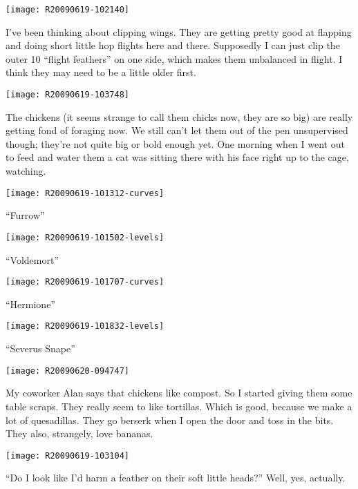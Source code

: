\texttt{[image: R20090619-102140]}

I've been thinking about clipping wings.  They are getting pretty good
at flapping and doing short little hop flights here and there.
Supposedly I can just clip the outer 10 ``flight feathers'' on one side,
which makes them unbalanced in flight.  I think they may need to be a
little older first. 
\newpage

\texttt{[image: R20090619-103748]}

The chickens (it seems strange to call them chicks now, they are so big)
are really getting fond of foraging now.  We still can't let them out of
the pen unsupervised though; they're not quite big or bold enough yet.
One morning when I went out to feed and water them a cat was sitting
there with his face right up to the cage, watching. 
\newpage

\texttt{[image: R20090619-101312-curves]}

\begin{center}{\Large ``Furrow'' }\end{center}
\newpage

\texttt{[image: R20090619-101502-levels]}

\begin{center}{\Large ``Voldemort'' }\end{center}
\newpage

\texttt{[image: R20090619-101707-curves]}

\begin{center}{\Large ``Hermione'' }\end{center}
\newpage

\texttt{[image: R20090619-101832-levels]}

\begin{center}{\Large ``Severus Snape'' }\end{center}
\newpage

\texttt{[image: R20090620-094747]}

My coworker Alan says that chickens like compost.  So I started giving
them some table scraps.  They really seem to like tortillas.  Which is
good, because we make a lot of quesadillas.  They go berserk when I open
the door and toss in the bits.  They also, strangely, love bananas.
\newpage

\texttt{[image: R20090619-103104]}

``Do I look like I'd harm a feather on their soft little heads?''  Well,
yes, actually. 
\newpage

